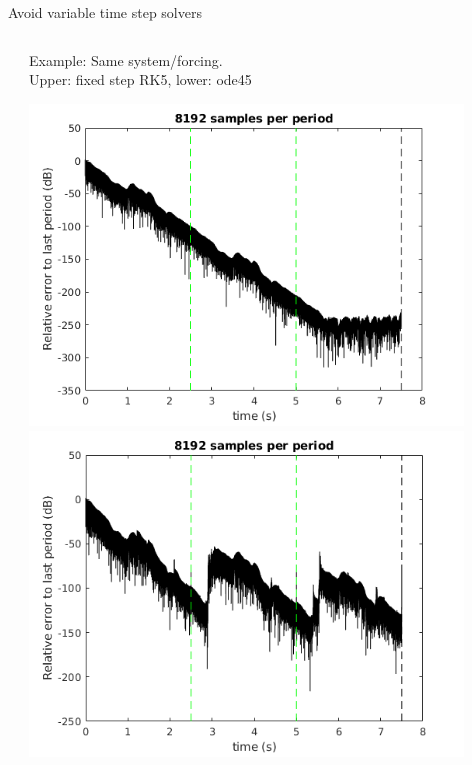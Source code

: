 \documentclass[9pt]{beamer}
\begin{document}
\begin{frame}{Avoid variable time step solvers}
\begin{columns}
\begin{column}{0.5\textwidth}
    \end{column}
    \begin{column}{0.5\textwidth}  %
      Example: Same system/forcing.\\ Upper: fixed step RK5, lower: ode45
      \begin{center}
        \includegraphics[width=0.9\textwidth]{fig/periodicity_ode5}
        \includegraphics[width=0.9\textwidth]{fig/periodicity_ode45}
      \end{center}
    \end{column}
  \end{columns}
\end{frame}
\end{document}
